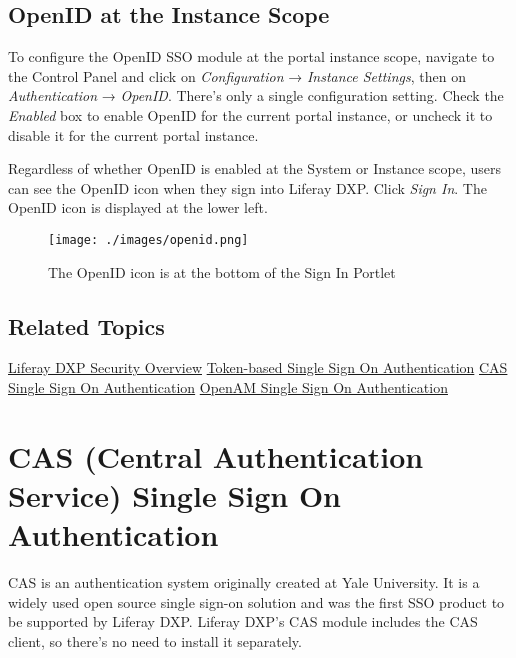 \subsection{OpenID at the Instance
Scope}\label{openid-at-the-instance-scope}

To configure the OpenID SSO module at the portal instance scope,
navigate to the Control Panel and click on \emph{Configuration} →
\emph{Instance Settings}, then on \emph{Authentication} → \emph{OpenID}.
There's only a single configuration setting. Check the \emph{Enabled}
box to enable OpenID for the current portal instance, or uncheck it to
disable it for the current portal instance.

Regardless of whether OpenID is enabled at the System or Instance scope,
users can see the OpenID icon when they sign into Liferay DXP. Click
\emph{Sign In}. The OpenID icon is displayed at the lower left.

\begin{figure}
\centering
\texttt{[image: ./images/openid.png]}
\caption{The OpenID icon is at the bottom of the Sign In Portlet}
\end{figure}

\subsection{Related Topics}\label{related-topics-7}

\href{/docs/7-0/deploy/-/knowledge_base/d/liferay-portal-security-overview}{Liferay
DXP Security Overview}
\href{/docs/7-0/deploy/-/knowledge_base/d/token-based-single-sign-on-authentication}{Token-based
Single Sign On Authentication}
\href{/docs/7-0/deploy/-/knowledge_base/d/cas-central-authentication-service-single-sign-on-authentication}{CAS
Single Sign On Authentication}
\href{/docs/7-0/deploy/-/knowledge_base/d/opensso-single-sign-on-authentication}{OpenAM
Single Sign On Authentication}

\section{CAS (Central Authentication Service) Single Sign On
Authentication}\label{cas-central-authentication-service-single-sign-on-authentication}

CAS is an authentication system originally created at Yale University.
It is a widely used open source single sign-on solution and was the
first SSO product to be supported by Liferay DXP. Liferay DXP's CAS module
includes the CAS client, so there's no need to install it separately.

